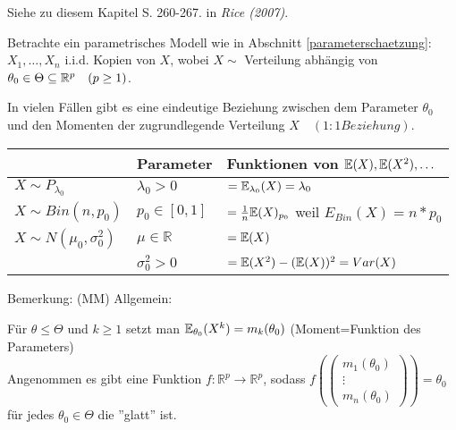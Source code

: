 \documentclass{tstextbook}
\begin{document}
\begin{book}
 Siehe zu diesem Kapitel S. 260-267. in	\textit{Rice (2007)}.
\end{book}


Betrachte ein parametrisches Modell wie in Abschnitt \ref{parameterschaetzung}:
$ X_1,\ldots,X_n $ i.i.d. Kopien von $ X $, wobei $ X \sim $ Verteilung abhängig von $ \theta_0 \in \Theta \subseteq \mathbb R^p \quad (p\ge1) $.

In vielen Fällen gibt es eine eindeutige Beziehung zwischen dem Parameter $ \theta_0 $ und den Momenten der zugrundlegende Verteilung  $ X \quad (1:1 Beziehung) $.

\begin{example}
	
	\begin{center}
	\begin{tabular}{l|ll}
								& Parameter 	& Funktionen von $ \mathbb E(X), \mathbb E(X^2),\ldots $ \\
		\midrule
		$ X\sim P_{\lambda_0} $ 	& $ \lambda_0>0	$	& $ = \mathbb E_{\lambda_0}(X)={\lambda_0} $\\
		\midrule
		$ X\sim Bin(n,p_0) $ 		& $ p_0\in[0,1] $			& $ = \frac{1}{n} \mathbb E(X)_{p_0} $ weil $ E_{Bin}(X)=n*p_0 $\\
		\midrule
		$ X\sim N(\mu_0, \sigma_0^2) $ & $ \mu\in\mathbb{R} $	& $ = \mathbb E(X) $\\
								& $ \sigma_0^2>0 $	& $ = \mathbb E(X^2)-(\mathbb E(X))^2=Var(X) $
	\end{tabular}
	\end{center}
\end{example}
	

	\begin{remark}
		Bemerkung: (MM) Allgemein:
	
		Für $ \theta \leq \Theta $ und $ k \geq 1$ setzt man
		$ \mathbb E_{\theta_0}(X^k) = m_k(\theta_0) $ (Moment=Funktion des Parameters) \\
		
		Angenommen es gibt eine Funktion $f:\mathbb{R}^p \rightarrow \mathbb{R}^p $, sodass 
		$
		 f\left(\begin{pmatrix}
			m_1(\theta_0) \\ \vdots \\ m_n(\theta_0)
		\end{pmatrix}\right) = \theta_0
		$
		für jedes $\theta_0 \in \Theta$ die ''glatt''  ist. \\		
		
	\end{remark}
\end{document}
